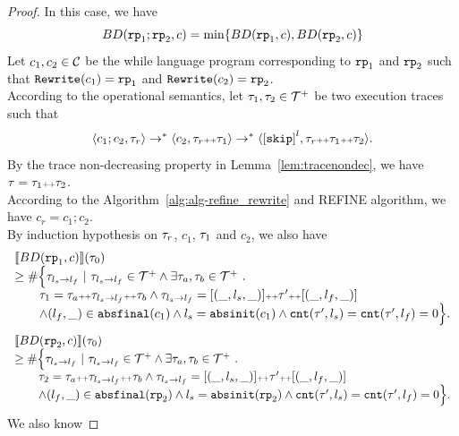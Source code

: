 \begin{proof}
In this case, we have
\[
  BD(\rprog_1; \rprog_2, c) = \min \left\{BD(\rprog_1, c), BD(\rprog_2, c) \right\}
\]
Let $c_1, c_2 \in \mathcal{C}$ be the while language program corresponding to $\mathtt{rp}_1$ and $\mathtt{rp}_2$ such that $\mathtt{Rewrite}(c_1) = \mathtt{rp}_1$ and $\mathtt{Rewrite}(c_2) = \mathtt{rp}_2$.
\\
According to the operational semantics, let $\mathtt{\tau}_1, \mathtt{\tau}_2 \in \mathcal{T}^{+}$ be two execution traces such that 
\[
  \config{c_1; c_2, \trace_r} \to^* \config{c_2, \trace_r \tracecat \trace_1} \to^* \config{\clabel{\eskip}^{l}, \trace_r \tracecat \trace_1 \tracecat \trace_2}.
\]
By the trace non-decreasing property in Lemma~\ref{lem:tracenondec}, we have $\mathtt{\tau} = \mathtt{\tau}_1 {\scriptscriptstyle ++} \mathtt{\tau}_2$.
\\
According to the Algorithm~\ref{alg:alg-refine_rewrite} and REFINE algorithm, we have $c_r = c_1; c_2$.
\\
By induction hypothesis on $\mathtt{\tau}_r$, $c_1$, $\mathtt{\tau}_1$ and $c_2$, we also have
\[
  \begin{array}{l}
    \llbracket BD(\mathtt{rp}_1, c) \rrbracket(\mathtt{\tau}_0)
    \\ \geq
    \# \Big\{\mathtt{\tau}_{l_s \to l_f} 
    ~\vert~ \mathtt{\tau}_{l_s \to l_f} \in \mathcal{T}^{+} 
    \land \exists \mathtt{\tau}_a, \mathtt{\tau}_b \in \mathcal{T}^{+}
    ~.~ 
    \\ \qquad
    \mathtt{\tau}_1 = \mathtt{\tau}_a {\scriptscriptstyle ++} \mathtt{\tau}_{l_s \to l_f} {\scriptscriptstyle ++} \mathtt{\tau}_b
    \land \mathtt{\tau}_{l_s \to l_f} = [(\_, l_s, \_)] {\scriptscriptstyle ++} \mathtt{\tau}' {\scriptscriptstyle ++} [(\_, l_f, \_)]
    \\ \qquad
    \land (l_{f}, \_) \in \mathtt{abs}{\mathtt{final}}(c_1)
    \land l_s = \mathtt{abs}{\mathtt{init}}(c_1)
    \land \mathtt{cnt}(\mathtt{\tau}', l_s) = \mathtt{cnt}(\mathtt{\tau}', l_f) = 0 
    \Big\}.
    \end{array}
\]
%
\[
  \begin{array}{l}
    \llbracket BD(\mathtt{rp}_2, c) \rrbracket(\mathtt{\tau}_0)
    \\ \geq
    \# \Big\{\mathtt{\tau}_{l_s \to l_f} 
    ~\vert~ \mathtt{\tau}_{l_s \to l_f} \in \mathcal{T}^{+} 
    \land \exists \mathtt{\tau}_a, \mathtt{\tau}_b \in \mathcal{T}^{+}
    ~.~ 
    \\ \qquad
    \mathtt{\tau}_2 = \mathtt{\tau}_a {\scriptscriptstyle ++} \mathtt{\tau}_{l_s \to l_f} {\scriptscriptstyle ++} \mathtt{\tau}_b
    \land \mathtt{\tau}_{l_s \to l_f} = [(\_, l_s, \_)] {\scriptscriptstyle ++} \mathtt{\tau}' {\scriptscriptstyle ++} [(\_, l_f, \_)]
    \\ \qquad
    \land (l_{f}, \_) \in \mathtt{abs}{\mathtt{final}}(\mathtt{rp}_2)
    \land l_s = \mathtt{abs}{\mathtt{init}}(\mathtt{rp}_2)
    \land \mathtt{cnt}(\mathtt{\tau}', l_s) = \mathtt{cnt}(\mathtt{\tau}', l_f) = 0 
    \Big\}.
    \end{array}
\]
We also know

\end{proof}
